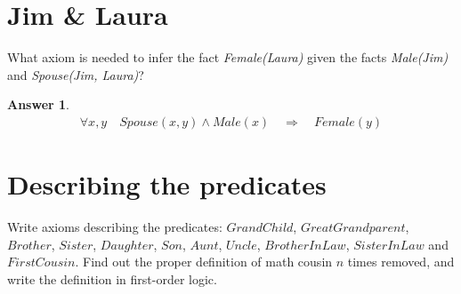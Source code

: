 \documentclass[a4paper]{article}
\renewcommand{\(}{\left(}
\renewcommand{\)}{\right)}
\theoremstyle{plain}
\theoremstyle{plain}
\theoremstyle{definition}
\newtheorem*{answer}{Answer}
\begin{document}
\section{Jim \& Laura}
What axiom is needed to infer the fact \textit{Female(Laura)} given the facts \textit{Male(Jim)} and \textit{Spouse(Jim, Laura)}?

\begin{shaded}
\begin{answer}
\begin{align*}
\forall x , y \quad Spouse(x,y) \wedge Male(x) \quad \Rightarrow \quad Female(y)
\end{align*}
\end{answer}
\end{shaded}

\section{Describing the predicates}
Write axioms describing the predicates: $GrandChild$, $GreatGrandparent$, $Brother$, $Sister$, $Daughter$, $Son$, $Aunt$, $Uncle$, $BrotherInLaw$, $SisterInLaw$ and $FirstCousin$. Find out the proper definition of math cousin $n$ times removed, and write the definition in first-order logic.
\end{document}
